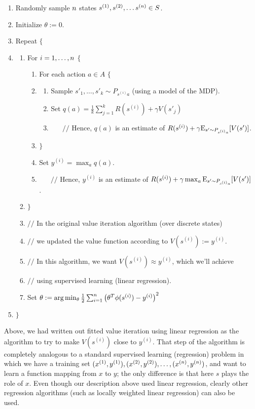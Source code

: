 \documentclass{article}
\begin{document}
\begin{enumerate}
\item Randomly sample ${n}$ states $s^{(1)}, s^{(2)}, \ldots s^{({n})} \in S$.
\item Initialize $\theta := 0$.
\item Repeat $\{$
  \item[] \begin{enumerate}
    \item[] For $i=1,\ldots,{n}$ $\{$
      \begin{enumerate}
      \item[] For each action $a \in A$ $\{$
      \item[] \begin{enumerate}
         \item[] Sample $s'_1, \ldots, s'_k \sim P_{s^{(i)}a}$ (using a model of the MDP).
         \item[] Set $q(a) = \frac{1}{k}\sum_{j=1}^k R(s^{(i)}) + \gamma V(s'_j)$
         \item[] $\;\;\;\;\;\; //$ Hence, $q(a)$ is an estimate of $R(s^{(i)}) + \gamma {\rm E}_{s' \sim P_{s^{(i)}a}}[V(s')]$.
      \end{enumerate}
      \item[] $\}$
      \item[] Set $y^{(i)} = \max_a q(a)$.
      \item[] $\;\;\;\;\;\; //$ Hence, $y^{(i)}$ is an estimate of $R(s^{(i)}) + \gamma \max_a {\rm E}_{s' \sim P_{s^{(i)}a}}[V(s')]$.
      \end{enumerate}
    \item[] $\}$
    \item[] $//$ In the original value iteration algorithm (over discrete states)
    \item[] $//$ we updated the value function according to $V(s^{(i)}) := y^{(i)}$.
    \item[] $//$ In this algorithm, we want $V(s^{(i)}) \approx y^{(i)}$, which we'll achieve
    \item[] $//$ using supervised learning (linear regression).
    \item[] Set $\theta := \arg \min_\theta \frac{1}{2} \sum_{i=1}^{n} \left(\theta^T \phi(s^{(i)}) - y^{(i)}\right)^2$
  \end{enumerate}
  \item[] $\}$
\end{enumerate}

Above, we had written out fitted value iteration using linear regression as the algorithm to try to make
$V(s^{(i)})$ close to $y^{(i)}$.  That step of the algorithm is completely analogous to a standard
supervised learning (regression) problem in which we have a training set
$(x^{(1)}, y^{(1)}), (x^{(2)}, y^{(2)}), \ldots, (x^{({n})}, y^{({n})})$, and want to learn
a function mapping from $x$ to $y$; the only difference is that here $s$ plays the role of $x$.
Even
though our description above used linear regression, clearly other regression algorithms
(such as locally weighted linear regression) can also be used.
\end{document}
